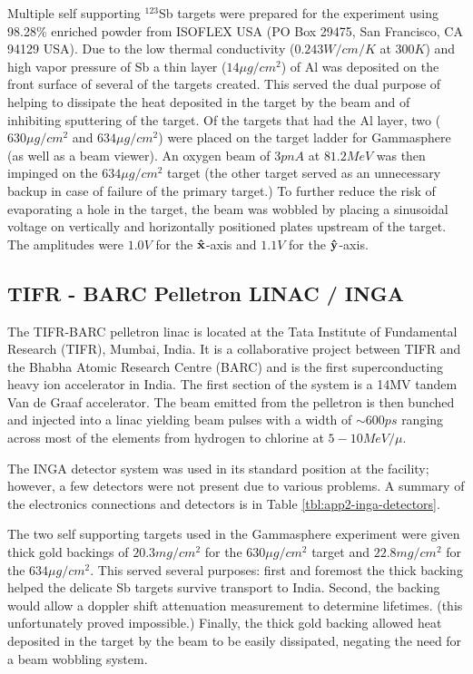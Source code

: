 Multiple self supporting $^{123}$Sb targets were prepared for the experiment using 98.28\% enriched powder from ISOFLEX USA (PO Box 29475, San Francisco, CA 94129 USA)\cite{sbTargets}. Due to the low thermal conductivity ($0.243W/cm/K$ at $300K$\cite{thermalCond}) and high vapor pressure\cite{sbPartialP,sbTargets} of Sb a thin layer ($14\mu{}g/cm^2$) of Al was deposited on the front surface of several of the targets created. This served the dual purpose of helping to dissipate the heat deposited in the target by the beam and of inhibiting sputtering of the target. Of the targets that had the Al layer, two ($630\mu{}g/cm^2$ and $634\mu{}g/cm^2$) were placed on the target ladder for Gammasphere (as well as a beam viewer). An oxygen beam of $3pnA$ at $81.2MeV$ was then impinged on the $634\mu{}g/cm^2$ target (the other target served as an unnecessary backup in case of failure of the primary target.) To further reduce the risk of evaporating a hole in the target, the beam was wobbled by placing a sinusoidal voltage on vertically and horizontally positioned plates upstream of the target. The amplitudes were $1.0V$ for the $\boldsymbol{\hat{\textbf{x}}}$-axis and $1.1V$ for the $\boldsymbol{\hat{\textbf{y}}}$-axis.

\subsection{TIFR - BARC Pelletron LINAC / INGA}
\label{ssec:exp-pr-details-inga}
The TIFR-BARC pelletron linac is located at the Tata Institute of Fundamental Research (TIFR), Mumbai, India. It is a collaborative project between TIFR and the Bhabha Atomic Research Centre (BARC) and is the first superconducting heavy ion accelerator in India. The first section of the system is a 14MV tandem Van de Graaf accelerator. The beam emitted from the pelletron is then bunched and injected into a linac yielding beam pulses with a width of $\sim{}600ps$ ranging across most of the elements from hydrogen to chlorine at $5-10MeV/\mu{}$.

The INGA detector system was used in its standard position at the facility; however, a few detectors were not present due to various problems. A summary of the electronics connections and detectors is in Table \ref{tbl:app2-inga-detectors}.

The two self supporting targets used in the Gammasphere experiment were given thick gold backings of $20.3mg/cm^2$ for the $630\mu{}g/cm^2$ target and $22.8mg/cm^2$ for the $634\mu{}g/cm^2$\cite{sbTargets}. This served several purposes: first and foremost the thick backing helped the delicate Sb targets survive transport to India. Second, the backing would allow a doppler shift attenuation measurement to determine lifetimes. (this unfortunately proved impossible.) Finally, the thick gold backing allowed heat deposited in the target by the beam to be easily dissipated, negating the need for a beam wobbling system.

